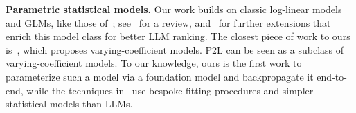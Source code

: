 \textbf{Parametric statistical models.} Our work builds on classic log-linear models and GLMs, like those of~\citet{bradley1952rank, rao1967ties}; see~\cite{mccullagh2019generalized} for a review, and~\cite{ameli2024statistical} for further extensions that enrich this model class for better LLM ranking.
The closest piece of work to ours is~\citet{hastie1993varying}, which proposes varying-coefficient models.
P2L can be seen as a subclass of varying-coefficient models.
To our knowledge, ours is the first work to parameterize such a model via a foundation model and backpropagate it end-to-end, while the techniques in~\citet{hastie1993varying} use bespoke fitting procedures and simpler statistical models than LLMs.
